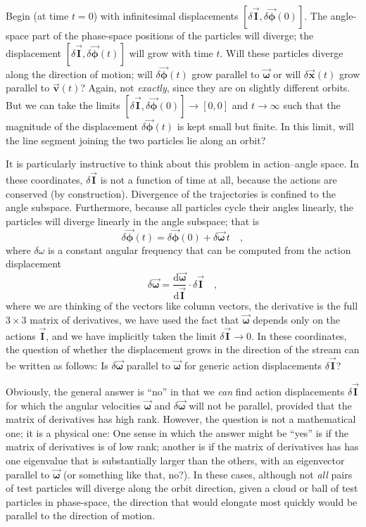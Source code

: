 \documentclass[12pt]{article}
\newcommand{\dd}{\mathrm{d}}
\newcommand{\tvector}[1]{\boldsymbol{\vec{#1}}}
\newcommand{\vx}{\tvector{x}}
\newcommand{\vv}{\tvector{v}}
\newcommand{\vI}{\tvector{I}}
\newcommand{\vphi}{\tvector{\phi}}
\newcommand{\vomega}{\tvector{\omega}}
\begin{document}
Begin (at time $t=0$) with infinitesimal displacements
$[\delta\vI,\delta\vphi(0)]$.  The angle-space part of the phase-space
positions of the particles will diverge; the displacement
$[\delta\vI,\delta\vphi(t)]$ will grow with time $t$.  Will these
particles diverge along the direction of motion; will $\delta\vphi(t)$
grow parallel to $\vomega$ or will $\delta\vx(t)$ grow parallel to
$\vv(t)$?  Again, not \emph{exactly}, since they are on slightly
different orbits.  But we can take the limits
$[\delta\vI,\delta\vphi(0)]\rightarrow [0,0]$ and $t\rightarrow
\infty$ such that the magnitude of the displacement $\delta\vphi(t)$
is kept small but finite.  In this limit, will the line segment
joining the two particles lie along an orbit?

It is particularly instructive to think about this problem in
action--angle space.  In these coordinates, $\delta\vI$ is not a
function of time at all, because the actions are conserved (by
construction).  Divergence of the trajectories is confined to the
angle subspace.  Furthermore, because all particles cycle their angles
linearly, the particles will diverge linearly in the angle subspace;
that is
\begin{equation}
\delta\vphi(t) = \delta\vphi(0) + \delta\vomega\,t \quad ,
\end{equation}
where $\delta\omega$ is a constant angular frequency that can be
computed from the action displacement
\begin{equation}
\delta\vomega = \frac{\dd\vomega}{\dd\vI}\cdot\delta\vI \quad ,
\end{equation}
where we are thinking of the vectors like column vectors, the
derivative is the full $3\times 3$ matrix of derivatives, we have used
the fact that $\vomega$ depends only on the actions $\vI$, and we have
implicitly taken the limit $\delta\vI\rightarrow 0$.  In these
coordinates, the question of whether the displacement grows in the
direction of the stream can be written as follows: Is $\delta\vomega$
parallel to $\vomega$ for generic action displacements $\delta\vI$?

Obviously, the general answer is ``no'' in that we \emph{can} find
action displacements $\delta\vI$ for which the angular velocities
$\vomega$ and $\delta\vomega$ will not be parallel, provided that the
matrix of derivatives has high rank.  However, the question is not a
mathematical one; it is a physical one: One sense in which the answer
might be ``yes'' is if the matrix of derivatives is of low rank;
another is if the matrix of derivatives has has one eigenvalue that is
substantially larger than the others, with an eigenvector parallel to
$\vomega$ (or something like that, no?).  In these cases, although not
\emph{all} pairs of test particles will diverge along the orbit
direction, given a cloud or ball of test particles in phase-space, the
direction that would elongate most quickly would be parallel to the
direction of motion.
\end{document}
